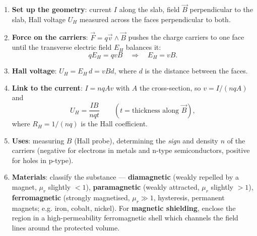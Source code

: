 \documentclass[11pt]{article}
\begin{document}
\begin{methode}
\begin{enumerate}
\item \textbf{Set up the geometry}: current $I$ along the slab, field $\vec{B}$ perpendicular to the slab, Hall voltage $U_H$ measured across the faces perpendicular to both.
\item \textbf{Force on the carriers}: $\vec{F}=q\vec{v}\wedge\vec{B}$ pushes the charge carriers to one face until the transverse electric field $E_H$ balances it:
\[ qE_H=qvB \quad\Longrightarrow\quad E_H=vB. \]
\item \textbf{Hall voltage}: $U_H=E_H\,d=vBd$, where $d$ is the distance between the faces.
\item \textbf{Link to the current}: $I=nqAv$ with $A$ the cross-section, so $v=I/(nqA)$ and
\[ U_H=\frac{IB}{nqt} \qquad (t=\text{thickness along }\vec{B}), \]
where $R_H=1/(nq)$ is the Hall coefficient.
\item \textbf{Uses}: measuring $B$ (Hall probe), determining the \emph{sign} and density $n$ of the carriers (negative for electrons in metals and n-type semiconductors, positive for holes in p-type).
\item \textbf{Materials}: classify the substance — \textbf{diamagnetic} (weakly repelled by a magnet, $\mu_r$ slightly $<1$), \textbf{paramagnetic} (weakly attracted, $\mu_r$ slightly $>1$), \textbf{ferromagnetic} (strongly magnetised, $\mu_r\gg1$, hysteresis, permanent magnets; e.g. iron, cobalt, nickel). For \textbf{magnetic shielding}, enclose the region in a high-permeability ferromagnetic shell which channels the field lines around the protected volume.
\end{enumerate}
\end{methode}
\end{document}
